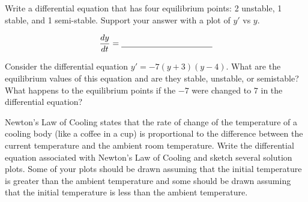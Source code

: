 \begin{problem}
    Write a differential equation that has four equilibrium points: 2 unstable,
1 stable, and 1 semi-stable.  Support your answer with a plot of
$y'$ vs $y$.

\begin{minipage}{0.5\columnwidth}
\end{minipage}
\begin{minipage}{0.5\columnwidth}
    \[ \frac{dy}{dt} = \underline{\hspace{1.5in}} \]
\end{minipage}
\end{problem}
\solution{
    \[ y' = (y-1)(y-2)(y-3)^2(y-4) \]
}

\begin{problem}
    Consider the differential equation $y' = -7(y+3)(y-4)$.  What are the equilibrium
    values of this equation and are they stable, unstable, or semistable? What happens to
    the equilibrium points if
    the $-7$ were changed to $7$ in the differential equation?
\end{problem}

\begin{problem}
    Newton's Law of Cooling states that the rate of change of the temperature of a cooling
    body (like a coffee in a cup) is proportional to the difference between the current
    temperature and the ambient room temperature.  Write the differential equation
    associated with Newton's Law of Cooling and sketch several solution plots.  Some of
    your plots should be drawn assuming that the initial temperature is greater than the
    ambient temperature and some should be drawn assuming that the initial temperature is
    less than the ambient temperature.
    \begin{center}
        \end{center}
\end{problem}
\solution{
    \[ \frac{dT}{dt} = -k(T-T_{amb}) \]
}


